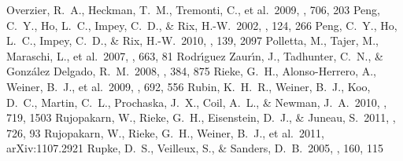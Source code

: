\documentclass[apj]{emulateapj}
\begin{document}
\begin{thebibliography}{}
 Overzier, R.~A., Heckman,
  T.~M., Tremonti, C., et al.\ 2009, \apj, 706, 203
 Peng, C.~Y., Ho, L.~C., Impey,
  C.~D., \& Rix, H.-W.\ 2002, \aj, 124, 266
 Peng, C.~Y., Ho, L.~C., Impey,
  C.~D., \& Rix, H.-W.\ 2010, \aj, 139, 2097
 Polletta, M., Tajer, M.,
  Maraschi, L., et al.\ 2007, \apj, 663, 81
  Rodr{\'{\i}}guez Zaur{\'{\i}}n, J., Tadhunter, C.~N., \&
  Gonz{\'a}lez Delgado, R.~M.\ 2008, \mnras, 384, 875
 Rieke, G.~H., Alonso-Herrero, A.,
  Weiner, B.~J., et al.\ 2009, \apj, 692, 556
 Rubin, K.~H.~R., Weiner, B.~J.,
  Koo, D.~C., Martin, C.~L., Prochaska, J.~X., Coil, A.~L., \& Newman,
  J.~A.\ 2010, \apj, 719, 1503
 Rujopakarn, W.,
  Rieke, G.~H., Eisenstein, D.~J., \& Juneau, S.\ 2011, \apj, 726, 93
 Rujopakarn, W., Rieke, G.~H.,
  Weiner, B.~J., et al.\ 2011, arXiv:1107.2921
 Rupke, D.~S., Veilleux, S., \&
  Sanders, D.~B.\ 2005, \apjs, 160, 115 %

\end{thebibliography}
\end{document}
